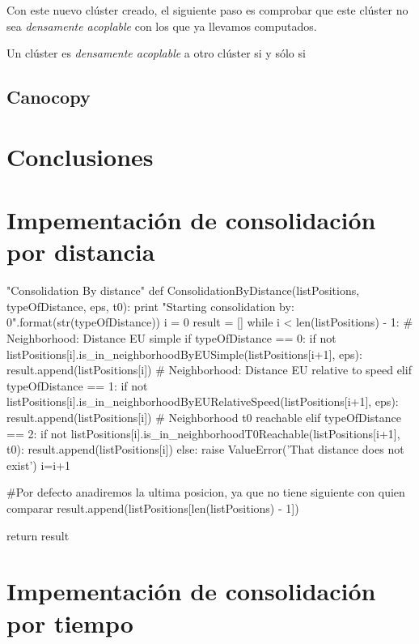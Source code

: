 \documentclass[a4paper, 12pt]{article}
\begin{document}
Con este nuevo cl\'uster creado, el siguiente paso es comprobar que este cl\'uster no sea \textit{densamente acoplable} con los que ya llevamos computados. 

Un cl\'uster es \textit{densamente acoplable} a otro cl\'uster si y s\'olo si 





\pagebreak
\subsection{Canocopy}

\pagebreak
\section{Conclusiones}

\newpage


\appendix
\section{Impementaci\'on de consolidaci\'on por distancia} \label{App:AppendixA}

\begin{python}
"Consolidation By distance"
def ConsolidationByDistance(listPositions, typeOfDistance, eps, t0):
	print "Starting consolidation by: {0}".format(str(typeOfDistance))
	i = 0
	result = []
    while i < len(listPositions) - 1:
    	# Neighborhood: Distance EU simple
        if typeOfDistance == 0:
        	if not listPositions[i].is_in_neighborhoodByEUSimple(listPositions[i+1], eps):
           		result.append(listPositions[i])
		# Neighborhood: Distance EU relative to speed
		elif typeOfDistance == 1:
        	if not listPositions[i].is_in_neighborhoodByEURelativeSpeed(listPositions[i+1], eps):
           		result.append(listPositions[i])
		# Neighborhood t0 reachable
        elif typeOfDistance == 2:
			if not listPositions[i].is_in_neighborhoodT0Reachable(listPositions[i+1], t0):
           		result.append(listPositions[i])
		else:
        	raise ValueError('That distance does not exist')
        i=i+1

	#Por defecto anadiremos la ultima posicion, ya que no tiene siguiente con quien comparar
	result.append(listPositions[len(listPositions) - 1])

	return result

\end{python}

\newpage
\section{Impementaci\'on de consolidaci\'on por tiempo} \label{App:AppendixB}
\end{document}
